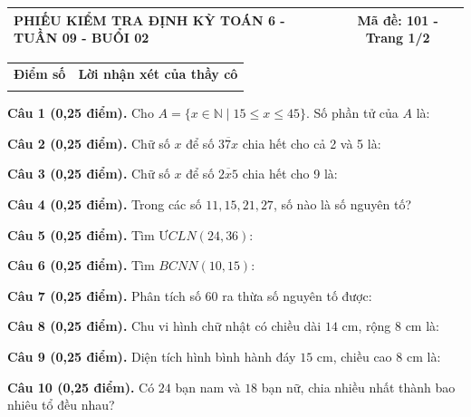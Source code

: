 \documentclass[12pt,a4paper]{article}
\begin{document}
\pagestyle{empty}
\noindent
\begin{tabularx}{\linewidth}{|X|c|}
\hline
\textbf{PHIẾU KIỂM TRA ĐỊNH KỲ TOÁN 6 - TUẦN 09 - BUỔI 02} & \textbf{Mã đề: 101 - Trang 1/2} \\
\hline
\end{tabularx}

\vspace{1.0mm}

\noindent
\begin{tabularx}{\linewidth}{|p{3.2cm}|X|}
\hline
\centering\textbf{Điểm số} & \centering\textbf{Lời nhận xét của thầy cô} \tabularnewline
\rule{0pt}{1.8cm} & \\
\hline
\end{tabularx}

\vspace{1.0mm}

\noindent\textbf{Câu 1 (0,25 điểm).} Cho $A = \{x \in \mathbb{N} \mid 15 \le x \le 45\}$. Số phần tử của $A$ là: \par\vspace{0.25mm}
\noindent\textbf{Câu 2 (0,25 điểm).} Chữ số $x$ để số $\overline{37x}$ chia hết cho cả 2 và 5 là: \par\vspace{0.25mm}
\noindent\textbf{Câu 3 (0,25 điểm).} Chữ số $x$ để số $\overline{2x5}$ chia hết cho 9 là: \par\vspace{0.25mm}
\noindent\textbf{Câu 4 (0,25 điểm).} Trong các số $11, 15, 21, 27$, số nào là số nguyên tố? \par\vspace{0.25mm}
\noindent\textbf{Câu 5 (0,25 điểm).} Tìm $ƯCLN(24, 36)$: \par\vspace{0.25mm}
\noindent\textbf{Câu 6 (0,25 điểm).} Tìm $BCNN(10, 15)$: \par\vspace{0.25mm}
\noindent\textbf{Câu 7 (0,25 điểm).} Phân tích số $60$ ra thừa số nguyên tố được: \par\vspace{0.25mm}
\noindent\textbf{Câu 8 (0,25 điểm).} Chu vi hình chữ nhật có chiều dài $14\text{ cm}$, rộng $8\text{ cm}$ là: \par\vspace{0.25mm}
\noindent\textbf{Câu 9 (0,25 điểm).} Diện tích hình bình hành đáy $15\text{ cm}$, chiều cao $8\text{ cm}$ là: \par\vspace{0.25mm}
\noindent\textbf{Câu 10 (0,25 điểm).} Có $24$ bạn nam và $18$ bạn nữ, chia nhiều nhất thành bao nhiêu tổ đều nhau? \par\vspace{0.25mm}
\end{document}

